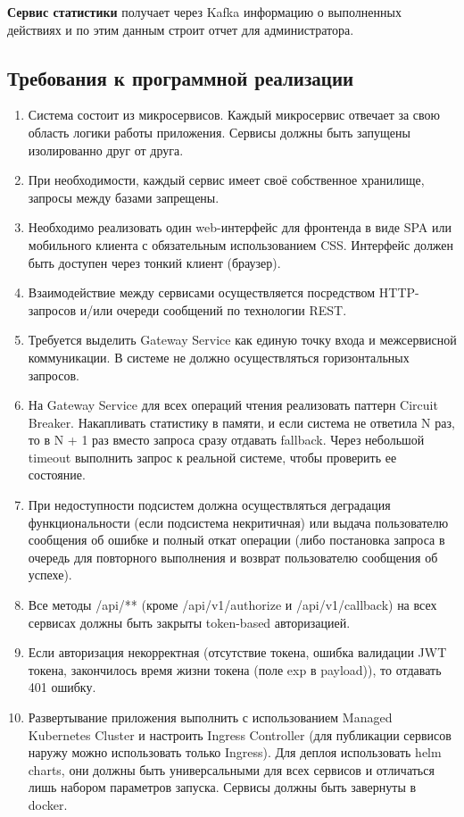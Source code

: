 \documentclass[a4paper, 12pt]{article}
\begin{document}
\begin{large}
\textbf{Сервис статистики} получает через Kafka информацию о выполненных действиях и по этим данным строит отчет для администратора.


\subsection{Требования к программной реализации}
\begin{enumerate}
	\item Система состоит из микросервисов. Каждый микросервис отвечает за свою область логики работы приложения. Сервисы должны быть запущены изолированно друг от друга.
	\item При необходимости, каждый сервис имеет своё собственное хранилище, запросы между базами запрещены.
	\item Необходимо реализовать один web-интерфейс для фронтенда в виде SPA или мобильного клиента с обязательным использованием CSS.  Интерфейс  должен  быть  доступен  через  тонкий  клиент (браузер).
	\item Взаимодействие между сервисами осуществляется посредством HTTP-запросов и/или очереди сообщений по технологии REST.
	\item Требуется выделить Gateway Service как единую точку входа и межсервисной коммуникации. В системе не должно осуществляться горизонтальных запросов.
	\item На Gateway Service для всех операций чтения реализовать паттерн Circuit Breaker. Накапливать статистику в памяти, и если система не ответила N раз, то в N + 1 раз вместо запроса сразу отдавать fallback. Через небольшой timeout выполнить запрос к реальной системе, чтобы проверить ее состояние.
	\item При недоступности подсистем должна осуществляться деградация функциональности (если подсистема некритичная) или выдача пользователю сообщения об ошибке и полный откат операции (либо постановка запроса в очередь для повторного выполнения и возврат пользователю сообщения об успехе).
	\item Все методы /api/** (кроме /api/v1/authorize и /api/v1/callback) на всех сервисах должны быть закрыты token-based авторизацией.
	\item Если авторизация некорректная (отсутствие токена, ошибка валидации JWT токена, закончилось время жизни токена (поле exp в payload)), то отдавать 401 ошибку.
	\item Развертывание приложения выполнить с использованием Managed Kubernetes Cluster и настроить Ingress Controller (для публикации сервисов наружу можно использовать только Ingress). Для деплоя использовать helm charts, они должны быть универсальными для всех сервисов и отличаться лишь набором параметров запуска. Сервисы должны быть завернуты в docker.
\end{enumerate}


\end{large}
\end{document}
